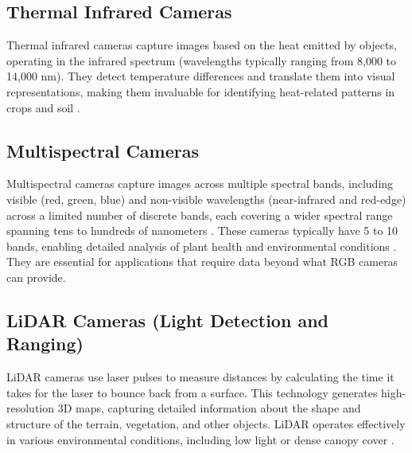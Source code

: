 \subsection{Thermal Infrared Cameras}

Thermal infrared cameras capture images based on the heat emitted by objects, operating in the infrared spectrum (wavelengths typically ranging from 8,000 to 14,000 nm). They detect temperature differences and translate them into visual representations, making them invaluable for identifying heat-related patterns in crops and soil \parencite{delavarpour2021technical}.



\subsection{Multispectral Cameras}

Multispectral cameras capture images across multiple spectral bands, including visible (red, green, blue) and non-visible wavelengths (near-infrared and red-edge) across a limited number of discrete bands, each covering a wider spectral range spanning tens to hundreds of nanometers \parencite{lu2020recent}. These cameras typically have 5 to 10 bands, enabling detailed analysis of plant health and environmental conditions \parencite{delavarpour2021technical}. They are essential for applications that require data beyond what RGB cameras can provide.

\subsection{LiDAR Cameras (Light Detection and Ranging)}

LiDAR cameras use laser pulses to measure distances by calculating the time it takes for the laser to bounce back from a surface. This technology generates high-resolution 3D maps, capturing detailed information about the shape and structure of the terrain, vegetation, and other objects. LiDAR operates effectively in various environmental conditions, including low light or dense canopy cover \parencite{delavarpour2021technical}.


